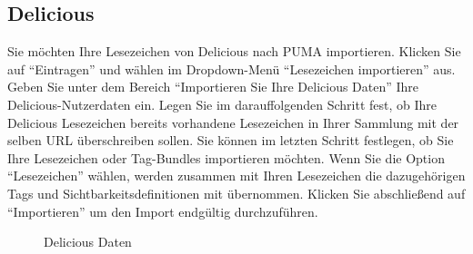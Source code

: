 \subsection{Delicious}
Sie möchten Ihre Lesezeichen von Delicious nach PUMA importieren. Klicken Sie auf \enquote{Eintragen} und wählen im Dropdown-Menü \enquote{Lesezeichen importieren} aus. Geben Sie unter dem Bereich \enquote{Importieren Sie Ihre Delicious Daten} Ihre Delicious-Nutzerdaten ein. \newline
Legen Sie im darauffolgenden Schritt fest, ob Ihre Delicious Lesezeichen bereits vorhandene Lesezeichen in Ihrer Sammlung mit der selben URL überschreiben sollen.\newline
Sie können im letzten Schritt festlegen, ob Sie Ihre Lesezeichen oder Tag-Bundles importieren möchten. Wenn Sie die Option \enquote{Lesezeichen} wählen, werden zusammen mit Ihren Lesezeichen die dazugehörigen Tags und Sichtbarkeitsdefinitionen mit übernommen.
\newline Klicken Sie abschließend auf \enquote{Importieren} um den Import endgültig durchzuführen.
\begin{figure}[h!]
 \centering
 \caption{Delicious Daten}
 \label{figure018}
\end{figure} 
